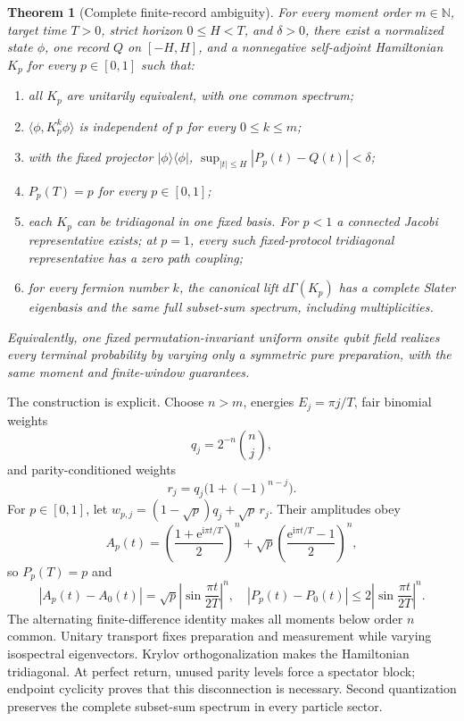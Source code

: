 \documentclass[10pt]{article}
\newtheorem{theorem}{Theorem}
\theoremstyle{definition}
\newcommand{\ee}{\mathrm e}
\newcommand{\ii}{\mathrm i}
\begin{document}
\begin{theorem}[Complete finite-record ambiguity]
\label{thm:ambiguity}
For every moment order $m\in\mathbb N$, target time $T>0$, strict horizon
$0\le H<T$, and $\delta>0$, there exist a normalized state $\phi$, one
record $Q$ on $[-H,H]$, and a nonnegative self-adjoint Hamiltonian
$K_p$ for every $p\in[0,1]$ such that:
\begin{enumerate}[leftmargin=1.55em]
\item all $K_p$ are unitarily equivalent, with one common spectrum;
\item $\langle\phi,K_p^k\phi\rangle$ is independent of $p$ for every
      $0\le k\le m$;
\item with the fixed projector $\lvert\phi\rangle\langle\phi\rvert$,
      $\sup_{|t|\le H}|P_p(t)-Q(t)|<\delta$;
\item $P_p(T)=p$ for every $p\in[0,1]$;
\item each $K_p$ can be tridiagonal in one fixed basis.  For $p<1$ a
      connected Jacobi representative exists; at $p=1$, every such
      fixed-protocol tridiagonal representative has a zero path coupling;
\item for every fermion number $k$, the canonical lift
      $d\Gamma(K_p)$ has a complete Slater eigenbasis and the same full
      subset-sum spectrum, including multiplicities.
\end{enumerate}
Equivalently, one fixed permutation-invariant uniform onsite qubit field
realizes every terminal probability by varying only a symmetric pure
preparation, with the same moment and finite-window guarantees.
\end{theorem}

The construction is explicit.  Choose $n>m$, energies
$E_j=\pi j/T$, fair binomial weights
\begin{equation}
 q_j=2^{-n}\binom{n}{j},                               \label{eq:binomial}
\end{equation}
and parity-conditioned weights
\begin{equation}
 r_j=q_j\bigl(1+(-1)^{n-j}\bigr).                     \label{eq:parity}
\end{equation}
For $p\in[0,1]$, let
$w_{p,j}=(1-\sqrt p)q_j+\sqrt p\,r_j$.  Their amplitudes obey
\begin{equation}
 A_p(t)=\left(\frac{1+\ee^{\ii\pi t/T}}2\right)^n
 +\sqrt p\left(\frac{\ee^{\ii\pi t/T}-1}2\right)^n,  \label{eq:clockamp}
\end{equation}
so $P_p(T)=p$ and
\begin{equation}
 |A_p(t)-A_0(t)|=\sqrt p\left|\sin\frac{\pi t}{2T}\right|^n,
 \quad
 |P_p(t)-P_0(t)|\le2\left|\sin\frac{\pi t}{2T}\right|^n. \label{eq:hiding}
\end{equation}
The alternating finite-difference identity makes all moments below order
$n$ common.  Unitary transport fixes preparation and measurement while
varying isospectral eigenvectors.  Krylov orthogonalization makes the
Hamiltonian tridiagonal.  At perfect return, unused parity levels force a
spectator block; endpoint cyclicity proves that this disconnection is
necessary.  Second quantization preserves the complete subset-sum spectrum
in every particle sector.
\end{document}
